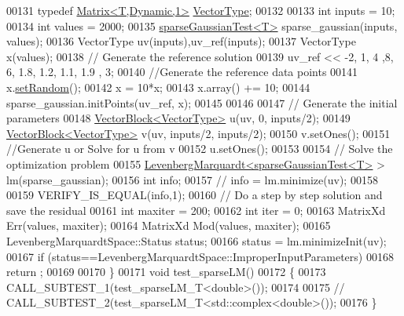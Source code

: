 \begin{DoxyCode}
00131   \textcolor{keyword}{typedef} \hyperlink{group___core___module_class_eigen_1_1_matrix}{Matrix<T,Dynamic,1>} \hyperlink{group___core___module}{VectorType};
00132   
00133   \textcolor{keywordtype}{int} inputs = 10;
00134   \textcolor{keywordtype}{int} values = 2000;
00135   \hyperlink{structsparse_gaussian_test}{sparseGaussianTest<T>} sparse\_gaussian(inputs, values);
00136   VectorType uv(inputs),uv\_ref(inputs);
00137   VectorType x(values);
00138   \textcolor{comment}{// Generate the reference solution }
00139   uv\_ref << -2, 1, 4 ,8, 6, 1.8, 1.2, 1.1, 1.9 , 3;
00140   \textcolor{comment}{//Generate the reference data points}
00141   x.\hyperlink{class_eigen_1_1_plain_object_base_af0e576a0e1aefc9ee346de44cc352ba3}{setRandom}();
00142   x = 10*x;
00143   x.array() += 10;
00144   sparse\_gaussian.initPoints(uv\_ref, x);
00145   
00146   
00147   \textcolor{comment}{// Generate the initial parameters }
00148   \hyperlink{group___core___module_class_eigen_1_1_vector_block}{VectorBlock<VectorType>} u(uv, 0, inputs/2); 
00149   \hyperlink{group___core___module_class_eigen_1_1_vector_block}{VectorBlock<VectorType>} v(uv, inputs/2, inputs/2);
00150   v.setOnes();
00151   \textcolor{comment}{//Generate u or Solve for u from v}
00152   u.setOnes();
00153   
00154   \textcolor{comment}{// Solve the optimization problem}
00155   \hyperlink{class_eigen_1_1_levenberg_marquardt}{LevenbergMarquardt<sparseGaussianTest<T>} > lm(sparse\_gaussian);
00156   \textcolor{keywordtype}{int} info;
00157 \textcolor{comment}{//   info = lm.minimize(uv);}
00158   
00159   VERIFY\_IS\_EQUAL(info,1);
00160     \textcolor{comment}{// Do a step by step solution and save the residual }
00161   \textcolor{keywordtype}{int} maxiter = 200;
00162   \textcolor{keywordtype}{int} iter = 0;
00163   MatrixXd Err(values, maxiter);
00164   MatrixXd Mod(values, maxiter);
00165   LevenbergMarquardtSpace::Status status; 
00166   status = lm.minimizeInit(uv);
00167   \textcolor{keywordflow}{if} (status==LevenbergMarquardtSpace::ImproperInputParameters)
00168       return ;
00169 
00170 \}
00171 \textcolor{keywordtype}{void} test\_sparseLM()
00172 \{
00173   CALL\_SUBTEST\_1(test\_sparseLM\_T<double>());
00174   
00175   \textcolor{comment}{// CALL\_SUBTEST\_2(test\_sparseLM\_T<std::complex<double>());}
00176 \}
\end{DoxyCode}

